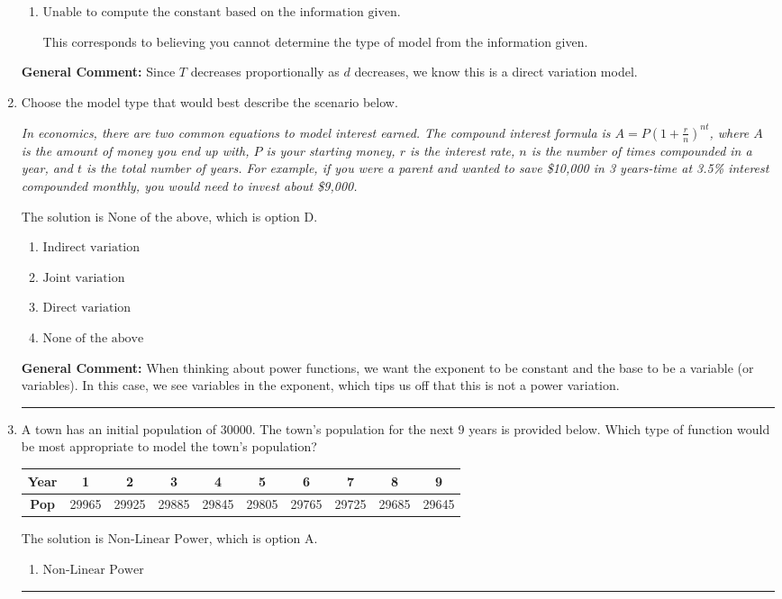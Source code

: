 \documentclass{extbook}[14pt]
\newcommand{\litem}[1]{\item #1

\rule{\textwidth}{0.4pt}}
\begin{document}
\begin{enumerate}
{\begin{enumerate}[label=\Alph*.]
This corresponds to the model $T^{3} = \frac{k}{d^{3}}$.
\item \( \text{Unable to compute the constant based on the information given.} \)

This corresponds to believing you cannot determine the type of model from the information given.
\end{enumerate}

\textbf{General Comment:} Since $T$ decreases proportionally as $d$ decreases, we know this is a direct variation model.
}
\litem{
Choose the model type that would best describe the scenario below.

\begin{center}
    \textit{ In economics, there are two common equations to model interest earned. The compound interest formula is $A = P (1 + \frac{r}{n})^{nt}$, where $A$ is the amount of money you end up with, $P$ is your starting money, $r$ is the interest rate, $n$ is the number of times compounded in a year, and $t$ is the total number of years. For example, if you were a parent and wanted to save \$10,000 in 3 years-time at 3.5\% interest compounded monthly, you would need to invest about \$9,000. }
\end{center}
The solution is \( \text{None of the above} \), which is option D.\begin{enumerate}[label=\Alph*.]
\item \( \text{Indirect variation} \)


\item \( \text{Joint variation} \)


\item \( \text{Direct variation} \)


\item \( \text{None of the above} \)


\end{enumerate}

\textbf{General Comment:} When thinking about power functions, we want the exponent to be constant and the base to be a variable (or variables). In this case, we see variables in the exponent, which tips us off that this is not a power variation.
}
\litem{
A town has an initial population of 30000. The town's population for the next 9 years is provided below. Which type of function would be most appropriate to model the town's population?


\begin{tabular}{c|c|c|c|c|c|c|c|c|c}
\textbf{Year} &1 &2 &3 &4 &5 &6 &7 &8 &9\tabularnewline \hline
\textbf{Pop} &29965 &29925 &29885 &29845 &29805 &29765 &29725 &29685 &29645\end{tabular}The solution is \( \text{Non-Linear Power} \), which is option A.\begin{enumerate}[label=\Alph*.]
\item \( \text{Non-Linear Power} \)


\end{enumerate}}
\end{enumerate}
\end{document}
